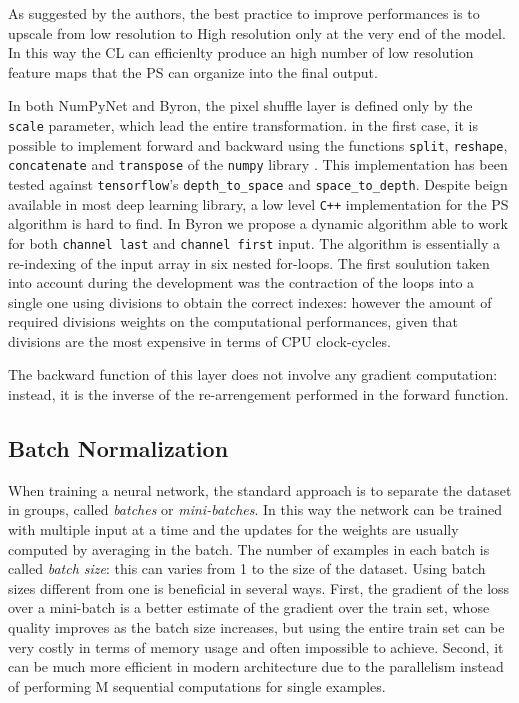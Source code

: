 \documentclass[12pt,a4paper]{report}
\begin{document}
As suggested by the authors, the best practice to improve performances is to upscale from low resolution to High resolution only at the very end of the model. 
In this way the CL can efficienlty produce an high number of low resolution feature maps that the PS can organize into the final output. 

In both NumPyNet and Byron, the pixel shuffle layer is defined only by the \texttt{scale} parameter, which lead the entire transformation.
in the first case, it is possible to implement forward and backward using the functions \texttt{split}, \texttt{reshape}, \texttt{concatenate} and \texttt{transpose} of the \texttt{numpy} library \cite{Numpy}. 
This implementation has been tested against \texttt{tensorflow}'s \texttt{depth\_to\_space} and \texttt{space\_to\_depth}.
Despite beign available in most deep learning library, a low level  \texttt{C++} implementation for the PS algorithm is hard to find. 
In Byron we propose a dynamic algorithm able to work for both \texttt{channel last} and \texttt{channel first} input. 
The algorithm is essentially a re-indexing of the input array in six nested for-loops. The first soulution taken into account during the development was the contraction of the loops into a single one using divisions to obtain the correct indexes: however the amount of required divisions weights on the computational performances, given that divisions are the most expensive in terms of CPU clock-cycles. 

The backward function of this layer does not involve any gradient computation: instead, it is the inverse of the re-arrengement performed in the forward function.

\subsection*{Batch Normalization}

When training a neural network, the standard approach is to separate the dataset in groups, called {\it batches} or {\it mini-batches}. 
In this way the network can be trained with multiple input at a time and the updates for the weights are usually computed by averaging in the batch.
The number of examples in each batch is called \textit{batch size}: this can varies from 1 to the size of the dataset. 
Using batch sizes different from one is beneficial in several ways. 
First, the gradient of the loss over a mini-batch is a better estimate of the gradient over the train set, whose quality improves as the batch size increases, but using the entire train set can be very costly in terms of memory usage and often impossible to achieve.
Second, it can be much more efficient in modern architecture due to the  parallelism instead of performing M sequential computations for single examples. \cite{batchnorm}
\end{document}
